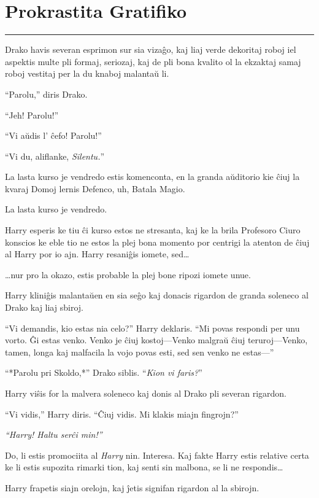 \chapter{Prokrastita Gratifiko}

\begin{center}\rule{3in}{0.4pt}\end{center}

Drako havis severan esprimon sur sia vizaĝo, kaj liaj verde dekoritaj
roboj iel aspektis multe pli formaj, seriozaj, kaj de pli bona kvalito
ol la ekzaktaj samaj roboj vestitaj per la du knaboj malantaŭ li.

``Parolu,'' diris Drako.

``Jeh! Parolu!''

``Vi aŭdis l' ĉefo! Parolu!''

``Vi du, aliflanke, \emph{Silentu.}''

La lasta kurso je vendredo estis komenconta, en la granda
aŭditorio kie ĉiuj la kvaraj Domoj lernis Defenco, uh, Batala Magio.

La lasta kurso je vendredo.

Harry esperis ke tiu ĉi kurso estos ne stresanta, kaj ke la brila
Profesoro Ciuro konscios ke eble tio ne estos la plej bona momento por
centrigi la atenton de ĉiuj al Harry por io ajn. Harry resaniĝis iomete, sed\ldots

\ldots nur pro la okazo, estis probable la plej bone ripozi iomete unue.

Harry kliniĝis malantaŭen en sia seĝo kaj donacis rigardon de granda soleneco al Drako kaj liaj sbiroj.

``Vi demandis, kio estas nia celo?'' Harry deklaris. ``Mi povas
respondi per unu vorto. Ĝi estas venko. Venko je ĉiuj kostoj—Venko
malgraŭ ĉiuj teruroj—Venko, tamen, longa kaj malfacila la vojo povas
esti, sed sen venko ne estas—''    

``*Parolu pri Skoldo,*'' Drako siblis. ``\emph{Kion vi faris?}''

Harry viŝis for la malvera soleneco kaj donis al Drako pli severan rigardon.

``Vi vidis,'' Harry diris. ``Ĉiuj vidis. Mi klakis miajn fingrojn?''

\emph{``Harry! Haltu serĉi min!''}

Do, li estis promociita al \emph{Harry} nin. Interesa. Kaj fakte Harry
estis relative certa ke li estis supozita rimarki tion, kaj senti sin
malbona, se li ne respondis\ldots

Harry frapetis siajn orelojn, kaj ĵetis signifan rigardon al la sbirojn.

